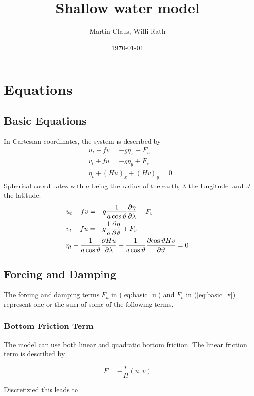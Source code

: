 \documentclass[a4paper]{article}
\title{Shallow water model}
\author{Martin Claus, Willi Rath}
\date{\today}
\begin{document}
\maketitle


\section{Equations}
\subsection{Basic Equations}
In Cartesian coordinates, the system is described by
\begin{align}
  \label{eq:basic_u}
  & u_t - fv = -g \eta_x + F_u \\
  \label{eq:basic_v}
  & v_t + fu = -g \eta_y + F_v \\
  \label{eq:basic_eta}
  & \eta_t + (Hu)_x + (Hv)_y = 0
\end{align}
Spherical coordinates with $a$ being the radius of the earth, $\lambda$ the 
longitude, and $\vartheta$ the latitude:
\begin{align}
  & u_t - fv = -g \frac{1}{a\cos\vartheta}\frac{\partial {\eta}}{\partial {\lambda}} + F_u \\
  & v_t + fu = -g \frac{1}{a}\frac{\partial {\eta}}{\partial {\vartheta}} + F_v \\
  & \eta_t + \frac{1}{a\cos\vartheta}\frac{\partial {Hu}}{\partial {\lambda}} + \frac{1}{a\cos\vartheta}\frac{\partial {\cos\vartheta Hv}}{\partial {\vartheta}} = 0
\end{align}
\subsection{Forcing and Damping}
The forcing and damping terms $F_u$ in (\ref{eq:basic_u}) and $F_v$ in (\ref{eq:basic_v}) represent one or the sum of some of the following terms.
\subsubsection{Bottom Friction Term}

The model can use both linear and quadratic bottom friction.
The linear friction term is described by

\begin{equation}
 F = -\frac rH (u,v)
\end{equation}

Discretizied this leads to
\end{document}
